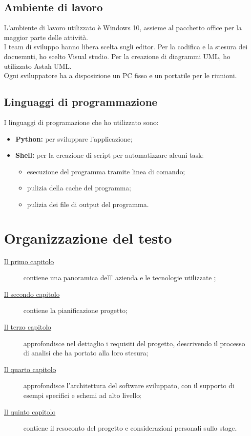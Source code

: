 \subsection{Ambiente di lavoro}
L'ambiente di lavoro utilizzato è Windows 10, assieme al pacchetto office per la maggior parte delle attività.\\
I team di sviluppo hanno libera scelta sugli editor. Per la codifica e la stesura dei docuemnti, ho scelto Visual studio. Per la creazione di diagrammi UML, ho utilizzato Astah UML.\\
Ogni sviluppatore ha a disposizione un PC fisso e un portatile per le riunioni.

\subsection{Linguaggi di programmazione}
I linguaggi di programazione che ho utilizzato sono:
\begin{itemize}
    \item \textbf{Python:} per sviluppare l'applicazione;
    \item \textbf{Shell:} per la creazione di script per automatizzare alcuni task:
    \begin{itemize}
        \item esecuzione del programma tramite linea di comando;
        \item pulizia della cache del programma;
        \item pulizia dei file di output del programma.
    \end{itemize}
\end{itemize}

\section{Organizzazione del testo}

\begin{description}
    \item[{\hyperref[cap:introduzione]{Il primo capitolo}}] contiene una panoramica dell' azienda e le tecnologie utilizzate \company;

    \item[{\hyperref[cap:descrizione-stage]{Il secondo capitolo}}] contiene la pianificazione progetto; 
    
    \item[{\hyperref[cap:analisi-requisiti]{Il terzo capitolo}}] approfondisce nel dettaglio i requisiti del progetto, descrivendo il processo di analisi che ha portato alla loro stesura;
    
    \item[{\hyperref[cap:progettazione-codifica]{Il quarto capitolo}}] approfondisce l'architettura del software sviluppato, con il supporto di esempi specifici e schemi ad alto livello;
        
    \item[{\hyperref[cap:conclusioni]{Il quinto capitolo}}] contiene il resoconto del progetto e considerazioni personali sullo stage. 
\end{description}